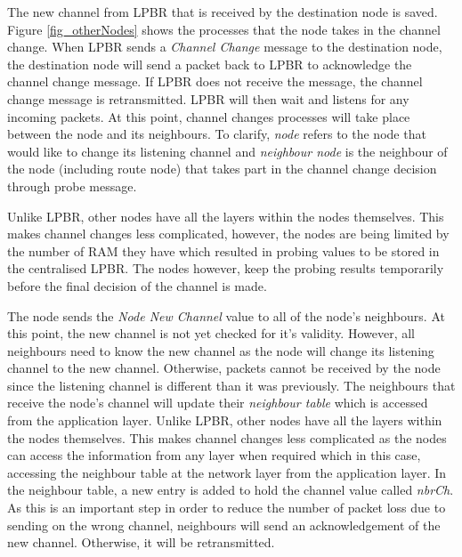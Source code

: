 The new channel from LPBR that is received by the destination node is saved. 
Figure \ref{fig_otherNodes} shows the processes that the node takes in the channel change. When LPBR sends a \textit{Channel Change} message to the destination node, the destination node will send a packet back to LPBR to acknowledge the channel change message. If LPBR does not receive the message, the channel change message is retransmitted. LPBR will then wait and listens for any incoming packets. At this point, channel changes processes will take place between the node and its neighbours. To clarify, \textit{node} refers to the node that would like to change its listening channel and \textit{neighbour node} is the neighbour of the node (including route node) that takes part in the channel change decision through probe message.

Unlike LPBR, other nodes have all the layers within the nodes themselves. This makes channel changes less complicated, however, the nodes are being limited by the number of RAM they have which resulted in probing values to be stored in the centralised LPBR. The nodes however, keep the probing results temporarily before the final decision of the channel is made. 

The node sends the \textit{Node New Channel} value to all of the node's neighbours. At this point, the new channel is not yet checked for it's validity. However, all neighbours need to know the new channel as the node will change its listening channel to the new channel. Otherwise, packets cannot be received by the node since the listening channel is different than it was previously. The neighbours that receive the node's channel will update their \textit{neighbour table} which is accessed from the application layer. 
Unlike LPBR, other nodes have all the layers within the nodes themselves. This makes channel changes less complicated as the nodes can access the information from any layer when required which in this case, accessing the neighbour table at the network layer from the application layer.
In the neighbour table, a new entry is added to hold the channel value called \textit{nbrCh}. As this is an important step in order to reduce the number of packet loss due to sending on the wrong channel, neighbours will send an acknowledgement of the new channel. Otherwise, it will be retransmitted. 

